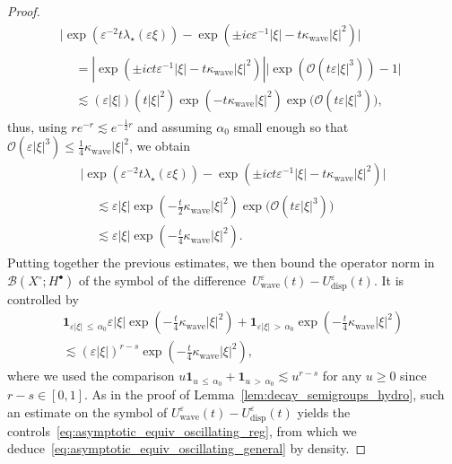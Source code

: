 \documentclass[AHL,Unicode,longabstracts,published]{cedram}
\newcommand{\Wave}{\mathrm{wave}}
\newcommand{\disp}{\mathrm{disp}}
\newcommand{\Burin}{\mathbf{1}}
\newcommand{\OO}{\mathcal{O}}
\newcommand{\BBB}{\mathscr{B}}
\newcommand{\Ssp}{H^{\bullet}}
\newcommand{\Slm}{X^{\circ}}
\renewcommand*\le{\leqslant}
\renewcommand*\geq{\geqslant}
\newcommand*\eps{{\varepsilon}}
\begin{document}
\begin{proof}
\begin{multline*}
\Big| \exp\left(\eps^{-2} t \lambda_{\star}(\eps \xi) \right)  - \exp\left(\pm i c \eps^{-1} |\xi| - t \kappa_\Wave | \xi |^2 \right) \Big| \\
\begin{aligned}
& = \left| \exp\left(\pm i c t \eps^{-1}|\xi| - t \kappa_\Wave | \xi |^2 \right) \right| \Big| \exp \left(\OO\left(t \eps | \xi |^3 \right) \right) -1 \Big|
\\
& \lesssim \left(\eps | \xi|\right) \left(t | \xi |^2\right) \exp\left(- t \kappa_\Wave | \xi |^2 \right) \exp\Big(\OO\left(t \eps | \xi |^3 \right) \Big),
\end{aligned}
\end{multline*}
thus, using $re^{-r} \lesssim e^{-\frac{1}{2}r}$ and assuming $\alpha_{0}$ small enough so that $\OO(\eps | \xi |^3) \le \frac{1}{4}\kappa_\Wave | \xi |^2$, we obtain
\begin{multline*}
\Big| \exp\left(\eps^{-2} t \lambda_{\star}(\eps \xi) \right)  - \exp\left(\pm i c t \eps^{-1}|\xi| - t \kappa_\Wave | \xi |^2 \right) \Big|\\
\begin{aligned}
& \lesssim \eps | \xi | \exp\left(- \frac{t}{2} \kappa_\Wave | \xi |^2 \right) \exp\Big(\OO\left(t \eps | \xi |^3 \right) \Big) \\
& \lesssim \eps | \xi | \exp\left(- \frac{t}{4} \kappa_\Wave | \xi |^2 \right).
\end{aligned}
\end{multline*}
Putting together the previous estimates, we then bound the operator norm in $\BBB(\Slm ;\Ssp)$ of the symbol of the difference~$U^\eps_\Wave(t) - U^\eps_\disp(t)$. It is controlled by
\begin{multline*}
\Burin _{\eps | \xi |\,\le\,\alpha_0} \eps | \xi | \exp\left(- \frac{t}{4} \kappa_\Wave | \xi |^2 \right)  + \Burin _{\eps | \xi |\,>\,\alpha_0} \exp\left(- \frac{t}{4} \kappa_\Wave | \xi |^2 \right) \\
 \lesssim \left(\eps | \xi |\right)^{r - s} \exp\left(- \frac{t}{4} \kappa_\Wave | \xi |^2 \right),
\end{multline*}
where we used the comparison $u\Burin_{u\,\le\,\alpha_{0}} + \Burin_{u\,>\,\alpha_{0}} \lesssim u^{r-s}$ for any $u \geq0$ since $r-s \in [0, 1]$. As in the proof of Lemma~\ref{lem:decay_semigroups_hydro}, such an estimate on the symbol of $U^\eps_\Wave(t) - U^\eps_\disp(t)$ yields the controls~\eqref{eq:asymptotic_equiv_oscillating_reg}, from which we deduce~\eqref{eq:asymptotic_equiv_oscillating_general} by density.
\end{proof}
\end{document}
